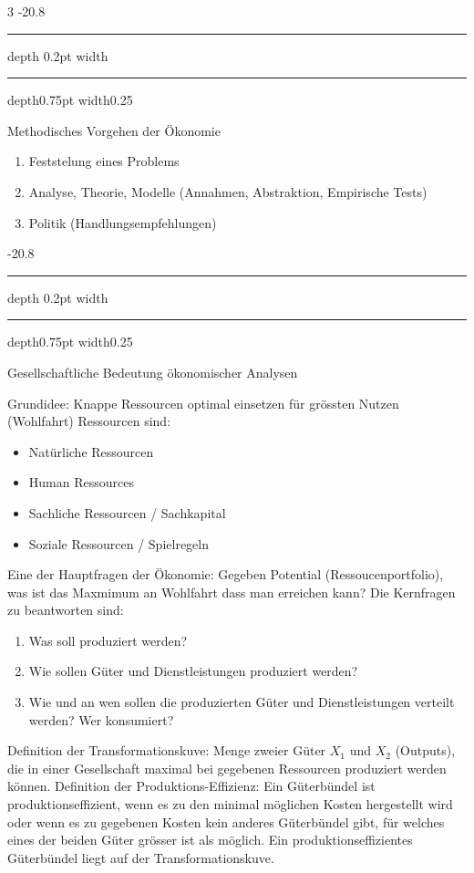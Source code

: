 \documentclass[8pt, landscape, fleqn]{scrartcl}
\makeatletter
\renewcommand{\subsection}{\@startsection{subsection}{1}{0mm}%
{-2\baselineskip}{0.8\baselineskip}%
{\hrule depth 0.2pt width\columnwidth\hrule depth0.75pt
width0.25\columnwidth\vspace*{1.2em}\large\bfseries\rmfamily}}
\makeatother
\begin{document}
\begin{multicols*}{3}
\subsection{Methodisches Vorgehen der Ökonomie}

\begin{enumerate}
    \item Feststelung eines Problems
    \item Analyse, Theorie, Modelle (Annahmen, Abstraktion, Empirische Tests)
    \item Politik (Handlungsempfehlungen)
\end{enumerate}

\subsection{Gesellschaftliche Bedeutung ökonomischer Analysen}

Grundidee: Knappe Ressourcen optimal einsetzen für grössten Nutzen (Wohlfahrt) Ressourcen sind:

\begin{itemize}
    \item Natürliche Ressourcen
    \item Human Ressources 
    \item Sachliche Ressourcen / Sachkapital
    \item Soziale Ressourcen / Spielregeln 
\end{itemize}

Eine der Hauptfragen der Ökonomie: Gegeben Potential (Ressoucenportfolio), was ist das Maxmimum an Wohlfahrt dass man erreichen kann? Die Kernfragen zu beantworten sind: 

\begin{enumerate}
    \item Was soll produziert werden?
    \item Wie sollen Güter und Dienstleistungen produziert werden?
    \item Wie und an wen sollen die produzierten Güter und Dienstleistungen verteilt werden? Wer konsumiert?
\end{enumerate}

Definition der Transformationskuve: Menge zweier Güter $X_1$ und $X_2$ (Outputs), die in einer Gesellschaft maximal bei gegebenen Ressourcen produziert werden können. \newline \newline
Definition der Produktions-Effizienz: Ein Güterbündel ist produktionseffizient, wenn es zu den minimal möglichen Kosten hergestellt wird oder wenn es zu gegebenen Kosten kein anderes Güterbündel gibt, für welches eines der beiden Güter grösser ist als möglich. Ein produktionseffizientes Güterbündel liegt auf der Transformationskuve. \newline \newline 

\end{multicols*}
\end{document}
